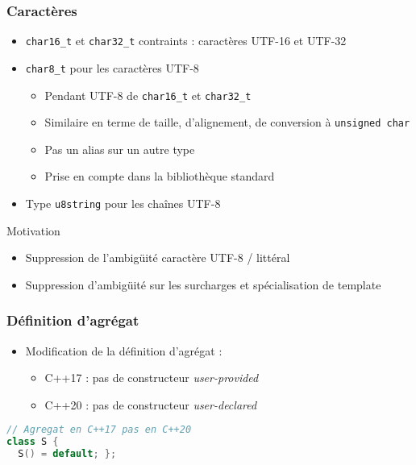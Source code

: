 \documentclass[C++.tex]{subfiles}
\begin{document}
\begin{frame}[fragile]
	\frametitle{Caractères}
	\begin{itemize}
		\item \lstinline|char16_t| et \lstinline|char32_t| contraints : caractères UTF-16 et UTF-32


		\item \lstinline|char8_t| pour les caractères UTF-8
		\begin{itemize}
			\item Pendant UTF-8 de \lstinline|char16_t| et \lstinline|char32_t|
			\item Similaire en terme de taille, d'alignement, de conversion à \lstinline|unsigned char|
			\item Pas un alias sur un autre type
			\item Prise en compte dans la bibliothèque standard
		\end{itemize}
		\item Type \lstinline|u8string| pour les chaînes UTF-8
	\end{itemize}

	\begin{block}{Motivation}
		\begin{itemize}
			\item Suppression de l'ambigüité caractère UTF-8 / littéral


			\item Suppression d'ambigüité sur les surcharges et spécialisation de template
		\end{itemize}
	\end{block}
\end{frame}

\begin{frame}[fragile]
	\frametitle{Définition d'agrégat}
	\begin{itemize}
		\item Modification de la définition d'agrégat :
		\begin{itemize}
			\item C++17 : pas de constructeur \textit{user-provided}
			\item C++20 : pas de constructeur \textit{user-declared}

		\end{itemize}
	\end{itemize}
	
	\begin{lstlisting}[language=C++]
// Agregat en C++17 pas en C++20
class S {
  S() = default; };\end{lstlisting}
\end{frame}
\end{document}

